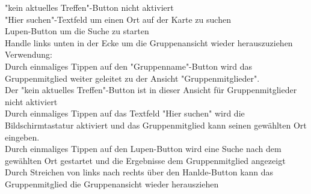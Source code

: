 "kein aktuelles Treffen"-Button nicht aktiviert\\
"Hier suchen"-Textfeld um einen Ort auf der Karte zu suchen\\
Lupen-Button um die Suche zu starten\\
Handle links unten in der Ecke um die Gruppenansicht wieder herauszuziehen\\
[Kleinüberschrift]Verwendung:\\
Durch einmaliges Tippen auf den "Gruppenname"-Button wird das Gruppenmitglied weiter geleitet zu der Ansicht "Gruppenmitglieder".\\
Der "kein aktuelles Treffen"-Button ist in dieser Ansicht für Gruppenmitglieder nicht aktiviert\\
Durch einmaliges Tippen auf das Textfeld "Hier suchen" wird die Bildschirmtastatur aktiviert und das Gruppenmitglied kann seinen gewählten Ort eingeben.\\
Durch einmaliges Tippen auf den Lupen-Button wird eine Suche nach dem gewählten Ort gestartet und die Ergebnisse dem Gruppenmitglied angezeigt\\
Durch Streichen von links nach rechts über den Hanlde-Button kann das Gruppenmitglied die Gruppenansicht wieder herausziehen\\ \\

